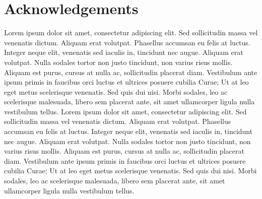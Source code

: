 \chapter*{Acknowledgements}

Lorem ipsum dolor sit amet, consectetur adipiscing elit. Sed sollicitudin massa vel venenatis dictum. Aliquam erat volutpat. Phasellus accumsan eu felis at luctus. Integer neque elit, venenatis sed iaculis in, tincidunt nec augue. Aliquam erat volutpat. Nulla sodales tortor non justo tincidunt, non varius risus mollis. Aliquam est purus, cursus at nulla ac, sollicitudin placerat diam. Vestibulum ante ipsum primis in faucibus orci luctus et ultrices posuere cubilia Curae; Ut at leo eget metus scelerisque venenatis. Sed quis dui nisi. Morbi sodales, leo ac scelerisque malesuada, libero sem placerat ante, sit amet ullamcorper ligula nulla vestibulum tellus.
Lorem ipsum dolor sit amet, consectetur adipiscing elit. Sed sollicitudin massa vel venenatis dictum. Aliquam erat volutpat. Phasellus accumsan eu felis at luctus. Integer neque elit, venenatis sed iaculis in, tincidunt nec augue. Aliquam erat volutpat. Nulla sodales tortor non justo tincidunt, non varius risus mollis. Aliquam est purus, cursus at nulla ac, sollicitudin placerat diam. Vestibulum ante ipsum primis in faucibus orci luctus et ultrices posuere cubilia Curae; Ut at leo eget metus scelerisque venenatis. Sed quis dui nisi. Morbi sodales, leo ac scelerisque malesuada, libero sem placerat ante, sit amet ullamcorper ligula nulla vestibulum tellus.
